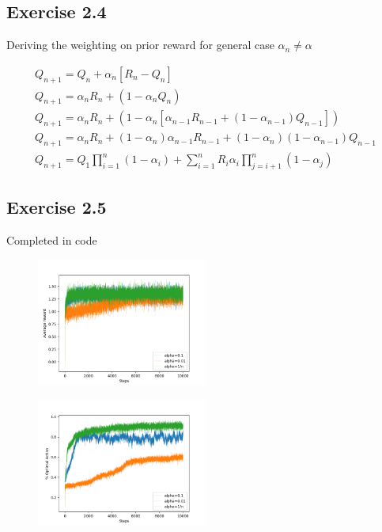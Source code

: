 \subsection{Exercise 2.4}
Deriving the weighting on prior reward for general case $\alpha_n \not= \alpha$

\begin{gather}
  Q_{n+1} = Q_n + \alpha_n[R_n - Q_n] \\
  Q_{n+1} = \alpha_nR_n + (1-\alpha_nQ_n) \\
  Q_{n+1} = \alpha_nR_n + (1-\alpha_n[\alpha_{n-1}R_{n-1} + (1-\alpha_{n-1})Q_{n-1}]) \\
  Q_{n+1} = \alpha_nR_n + (1-\alpha_n)\alpha_{n-1}R_{n-1} + (1-\alpha_n)(1-\alpha_{n-1})Q_{n-1} \\
  Q_{n+1} = Q_1\prod\limits_{i=1}^n(1-\alpha_i) + \sum\limits_{i=1}^nR_i\alpha_i\prod\limits_{j=i+1}^n(1-\alpha_j)
\end{gather}

\subsection{Exercise 2.5}
Completed in code


\begin{figure}[htbp]
  \centering
  \includegraphics[width=0.5\textwidth]{../../code/figures/chapter2/exercise2_5a.png}
\end{figure}

\begin{figure}[htbp]
  \centering
  \includegraphics[width=0.5\textwidth]{../../code/figures/chapter2/exercise2_5b.png}
\end{figure}

